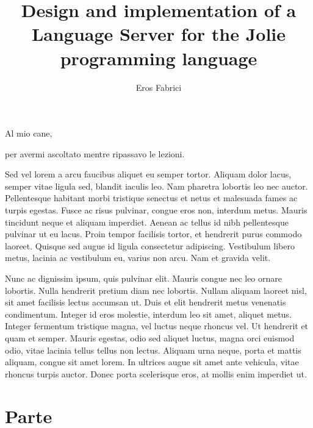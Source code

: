 \documentclass[target=bach]{thud}[2019/10/17]
\title{Design and implementation of a Language Server for the Jolie programming language​ }
\author{Eros Fabrici}
\begin{document}
\maketitle

\begin{dedication}Al mio cane,\par per avermi ascoltato mentre ripassavo le lezioni.\end{dedication}

\acknowledgements
Sed vel lorem a arcu faucibus aliquet eu semper tortor. Aliquam dolor lacus, semper vitae ligula sed, blandit iaculis leo. Nam pharetra lobortis leo nec auctor. Pellentesque habitant morbi tristique senectus et netus et malesuada fames ac turpis egestas. Fusce ac risus pulvinar, congue eros non, interdum metus. Mauris tincidunt neque et aliquam imperdiet. Aenean ac tellus id nibh pellentesque pulvinar ut eu lacus. Proin tempor facilisis tortor, et hendrerit purus commodo laoreet. Quisque sed augue id ligula consectetur adipiscing. Vestibulum libero metus, lacinia ac vestibulum eu, varius non arcu. Nam et gravida velit.

\abstract
Nunc ac dignissim ipsum, quis pulvinar elit. Mauris congue nec leo ornare lobortis. Nulla hendrerit pretium diam nec lobortis. Nullam aliquam laoreet nisl, sit amet facilisis lectus accumsan ut. Duis et elit hendrerit metus venenatis condimentum. Integer id eros molestie, interdum leo sit amet, aliquet metus. Integer fermentum tristique magna, vel luctus neque rhoncus vel. Ut hendrerit et quam et semper. Mauris egestas, odio sed aliquet luctus, magna orci euismod odio, vitae lacinia tellus tellus non lectus. Aliquam urna neque, porta et mattis aliquam, congue sit amet lorem. In ultrices augue sit amet ante vehicula, vitae rhoncus turpis auctor. Donec porta scelerisque eros, at mollis enim imperdiet ut. 

\tableofcontents



\mainmatter

\part{Parte}
\end{document}
